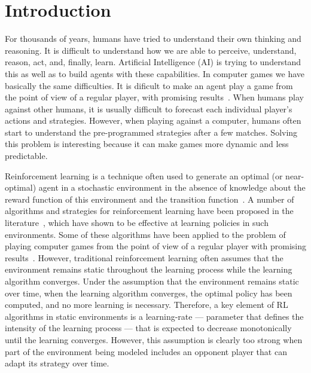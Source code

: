 \chapter{Introduction}
\label{chapter:introduction}

For thousands of years, humans have tried to understand their own thinking and reasoning.
It is difficult to understand how we are able to perceive, understand, reason, act, and, finally, learn.
Artificial Intelligence (AI) is trying to understand this as well as to build agents with these capabilities.
In computer games we have basically the same difficulties.
It is dificult to make an agent play a game from the point of view of a regular player, with promising results~\cite{taylor2011teachingmario,mohan2010ralationalmario}.
When humans play against other humans, it is usually difficult to forecast each individual player's actions and strategies.
However, when playing against a computer, humans often start to understand the pre-programmed strategies after a few matches.
Solving this problem is interesting because it can make games more dynamic and less predictable.

Reinforcement learning is a technique often used to generate an optimal (or near-optimal) agent in a stochastic environment in the absence of knowledge about the reward function of this environment and the transition function~\cite{kaelbling1996reinforcement}. 
A number of algorithms and strategies for reinforcement learning have been proposed in the literature~\cite{stone2005reinforcement,graepel2004learningfight}, which have shown to be effective at learning policies in such environments. 
Some of these algorithms have been applied to the problem of playing computer games from the point of view of a regular player with promising results~\cite{taylor2011teachingmario,mohan2010ralationalmario}. 
However, traditional reinforcement learning often assumes that the environment remains static throughout the learning process while the learning algorithm converges.
Under the assumption that the environment remains static over time, when the learning algorithm converges, the optimal policy has been computed, and no more learning is necessary. 
Therefore, a key element of RL algorithms in static environments is a learning-rate --- parameter that defines the intensity of the learning process --- that is expected to decrease monotonically until the learning converges. 
However, this assumption is clearly too strong when part of the environment being modeled includes an opponent player that can adapt its strategy over time. 


